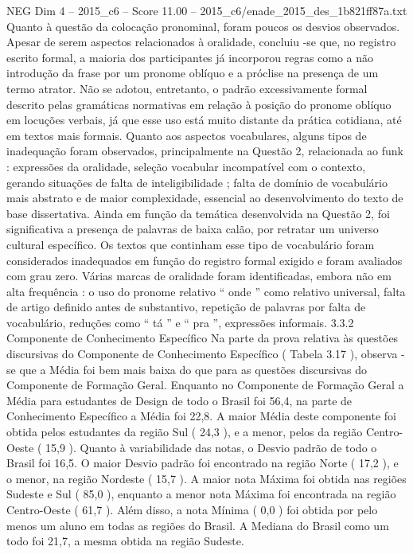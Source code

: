 \begin{textsample}{NEG Dim 4 – 2015\_c6 – Score 11.00 – 2015\_c6/enade\_2015\_des\_1b821ff87a.txt}
Quanto à questão da colocação pronominal, foram poucos os desvios observados.
Apesar de serem aspectos relacionados à oralidade, concluiu -se que, no registro escrito formal, a maioria dos participantes já incorporou regras como a não introdução da frase por um pronome oblíquo e a próclise na presença de um termo atrator.
Não se adotou, entretanto, o padrão excessivamente formal descrito pelas gramáticas normativas em relação à posição do pronome oblíquo em locuções verbais, já que esse uso está muito distante da prática cotidiana, até em textos mais formais.
Quanto aos aspectos vocabulares, alguns tipos de inadequação foram observados, principalmente na Questão 2, relacionada ao funk : expressões da oralidade, seleção vocabular incompatível com o contexto, gerando situações de falta de inteligibilidade ; falta de domínio de vocabulário mais abstrato e de maior complexidade, essencial ao desenvolvimento do texto de base dissertativa.
Ainda em função da temática desenvolvida na Questão 2, foi significativa a presença de palavras de baixa calão, por retratar um universo cultural específico.
Os textos que continham esse tipo de vocabulário foram considerados inadequados em função do registro formal exigido e foram avaliados com grau zero.
Várias marcas de oralidade foram identificadas, embora não em alta frequência : o uso do pronome relativo “ onde ” como relativo universal, falta de artigo definido antes de substantivo, repetição de palavras por falta de vocabulário, reduções como “ tá ” e “ pra ”, expressões informais. 3.3.2 Componente de Conhecimento Específico Na parte da prova relativa às questões discursivas do Componente de Conhecimento Específico ( Tabela 3.17 ), observa -se que a Média foi bem mais baixa do que para as questões discursivas do Componente de Formação Geral.
Enquanto no Componente de Formação Geral a Média para estudantes de Design de todo o Brasil foi 56,4, na parte de Conhecimento Específico a Média foi 22,8.
A maior Média deste componente foi obtida pelos estudantes da região Sul ( 24,3 ), e a menor, pelos da região Centro-Oeste ( 15,9 ).
Quanto à variabilidade das notas, o Desvio padrão de todo o Brasil foi 16,5.
O maior Desvio padrão foi encontrado na região Norte ( 17,2 ), e o menor, na região Nordeste ( 15,7 ).
A maior nota Máxima foi obtida nas regiões Sudeste e Sul ( 85,0 ), enquanto a menor nota Máxima foi encontrada na região Centro-Oeste ( 61,7 ).
Além disso, a nota Mínima ( 0,0 ) foi obtida por pelo menos um aluno em todas as regiões do Brasil.
A Mediana do Brasil como um todo foi 21,7, a mesma obtida na região Sudeste.

\end{textsample}

